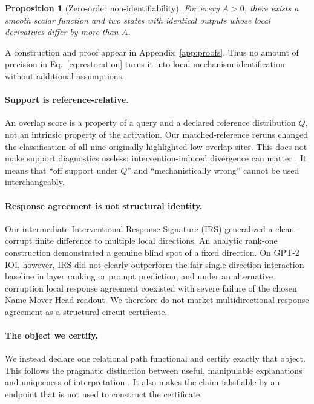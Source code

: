 \documentclass{article}
\newtheorem{proposition}{Proposition}
\begin{document}
\begin{proposition}[Zero-order non-identifiability]
For every $A>0$, there exists a smooth scalar function and two states with identical outputs whose local derivatives differ by more than $A$.
\end{proposition}
A construction and proof appear in Appendix~\ref{app:proofs}. Thus no amount of precision in Eq.~\ref{eq:restoration} turns it into local mechanism identification without additional assumptions.

\paragraph{Support is reference-relative.}
An overlap score is a property of a query and a declared reference distribution $Q$, not an intrinsic property of the activation. Our matched-reference reruns changed the classification of all nine originally highlighted low-overlap sites. This does not make support diagnostics useless: intervention-induced divergence can matter \citep{grant2026addressing}. It means that ``off support under $Q$'' and ``mechanistically wrong'' cannot be used interchangeably.

\paragraph{Response agreement is not structural identity.}
Our intermediate Interventional Response Signature (IRS) generalized a clean--corrupt finite difference to multiple local directions. An analytic rank-one construction demonstrated a genuine blind spot of a fixed direction. On GPT-2 IOI, however, IRS did not clearly outperform the fair single-direction interaction baseline in layer ranking or prompt prediction, and under an alternative corruption local response agreement coexisted with severe failure of the chosen Name Mover Head readout. We therefore do not market multidirectional response agreement as a structural-circuit certificate.

\paragraph{The object we certify.}
We instead declare one relational path functional and certify exactly that object. This follows the pragmatic distinction between useful, manipulable explanations and uniqueness of interpretation \citep{meloux2025identifiable,palumbo2025axiomatic}. It also makes the claim falsifiable by an endpoint that is not used to construct the certificate.
\end{document}
